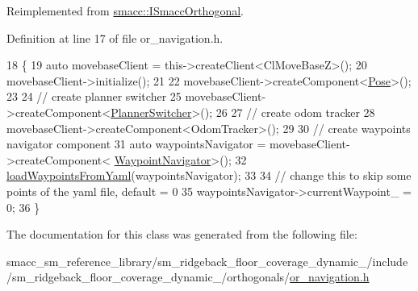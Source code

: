 Reimplemented from \hyperlink{classsmacc_1_1ISmaccOrthogonal_a6bb31c620cb64dd7b8417f8705c79c7a}{smacc\+::\+I\+Smacc\+Orthogonal}.



Definition at line 17 of file or\+\_\+navigation.\+h.


\begin{DoxyCode}
18     \{
19         \textcolor{keyword}{auto} movebaseClient = this->createClient<ClMoveBaseZ>();
20         movebaseClient->initialize();
21 
22         movebaseClient->createComponent<\hyperlink{classcl__move__base__z_1_1Pose}{Pose}>();
23 
24         \textcolor{comment}{// create planner switcher}
25         movebaseClient->createComponent<\hyperlink{classcl__move__base__z_1_1PlannerSwitcher}{PlannerSwitcher}>();
26 
27         \textcolor{comment}{// create odom tracker}
28         movebaseClient->createComponent<OdomTracker>();
29 
30         \textcolor{comment}{// create waypoints navigator component}
31         \textcolor{keyword}{auto} waypointsNavigator = movebaseClient->createComponent<
      \hyperlink{classcl__move__base__z_1_1WaypointNavigator}{WaypointNavigator}>();
32         \hyperlink{classsm__ridgeback__floor__coverage__dynamic__1_1_1OrNavigation_a4aa48f8ae2e850900e06ea10b472d6cf}{loadWaypointsFromYaml}(waypointsNavigator);
33 
34         \textcolor{comment}{// change this to skip some points of the yaml file, default = 0}
35         waypointsNavigator->currentWaypoint\_ = 0;
36     \}
\end{DoxyCode}


The documentation for this class was generated from the following file\+:\begin{DoxyCompactItemize}
\item 
smacc\+\_\+sm\+\_\+reference\+\_\+library/sm\+\_\+ridgeback\+\_\+floor\+\_\+coverage\+\_\+dynamic\+\_/include/sm\+\_\+ridgeback\+\_\+floor\+\_\+coverage\+\_\+dynamic\+\_/orthogonals/\hyperlink{sm__ridgeback__floor__coverage__dynamic__1_2include_2sm__ridgeback__floor__coverage__dynamic__1_2orthogonals_2or__navigation_8h}{or\+\_\+navigation.\+h}\end{DoxyCompactItemize}
